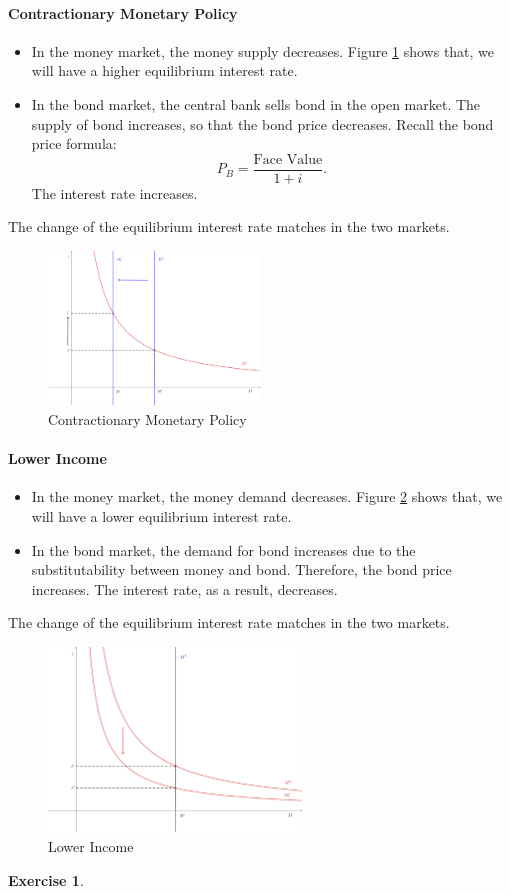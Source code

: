 \documentclass[12pt]{article}
\newtheorem{exercise}{Exercise}
\begin{document}
\paragraph{Contractionary Monetary Policy}
\begin{itemize}
	\item In the money market, the money supply decreases. Figure \ref{fig:money_eqm_02} shows that, we will have a higher equilibrium interest rate.
	\item In the bond market, the central bank sells bond in the open market. The supply of bond increases, so that the bond price decreases. Recall the bond price formula:
	\[P_B = \frac{\text{Face Value}}{1 + i}.\]
	The interest rate increases.
\end{itemize}
The change of the equilibrium interest rate matches in the two markets.

\begin{figure}[htp]
    \centering
    \includegraphics[width=0.5\textwidth]{money_eqm_02.png}
    \caption{Contractionary Monetary Policy}
    \label{fig:money_eqm_02}
\end{figure}

\paragraph{Lower Income}
\begin{itemize}
	\item In the money market, the money demand decreases. Figure \ref{fig:money_eqm_03} shows that, we will have a lower equilibrium interest rate.
	\item In the bond market, the demand for bond increases due to the substitutability between money and bond. Therefore, the bond price increases. The interest rate, as a result, decreases. 
\end{itemize}
The change of the equilibrium interest rate matches in the two markets.

\begin{figure}[htp]
    \centering
    \includegraphics[width=0.6\textwidth]{money_eqm_03.png}
    \caption{Lower Income}
    \label{fig:money_eqm_03}
\end{figure}

\begin{exercise}
	
\end{exercise}
\end{document}
